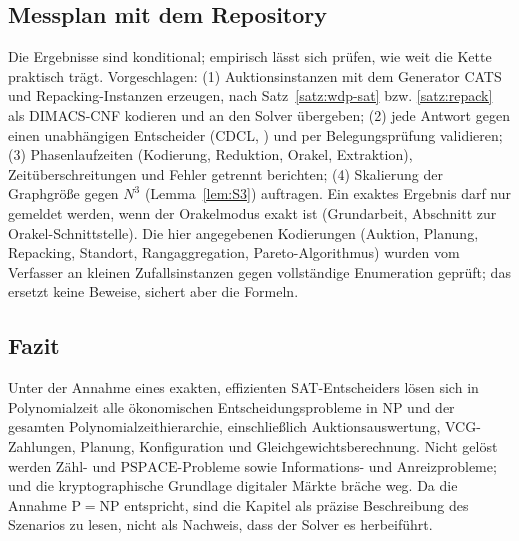 \documentclass[a4paper,12pt]{article}
\theoremstyle{definition}
\newcommand{\cP}{\ensuremath{\mathrm{P}}}
\newcommand{\cNP}{\ensuremath{\mathrm{NP}}}
\newcommand{\cPSPACE}{\ensuremath{\mathrm{PSPACE}}}
\begin{document}
\subsection{Messplan mit dem Repository}
Die Ergebnisse sind konditional; empirisch lässt sich prüfen, wie weit die Kette praktisch trägt. Vorgeschlagen: (1) Auktionsinstanzen mit dem Generator CATS \cite{leytonbrown2000} und Repacking-Instanzen erzeugen, nach Satz~\ref{satz:wdp-sat} bzw. \ref{satz:repack} als DIMACS-CNF kodieren und an den Solver übergeben; (2) jede Antwort gegen einen unabhängigen Entscheider (CDCL, \cite{minisat}) und per Belegungsprüfung validieren; (3) Phasenlaufzeiten (Kodierung, Reduktion, Orakel, Extraktion), Zeitüberschreitungen und Fehler getrennt berichten; (4) Skalierung der Graphgröße gegen \(N^3\) (Lemma~\ref{lem:S3}) auftragen. Ein exaktes Ergebnis darf nur gemeldet werden, wenn der Orakelmodus exakt ist (Grundarbeit, Abschnitt zur Orakel-Schnittstelle). Die hier angegebenen Kodierungen (Auktion, Planung, Repacking, Standort, Rangaggregation, Pareto-Algorithmus) wurden vom Verfasser an kleinen Zufallsinstanzen gegen vollständige Enumeration geprüft; das ersetzt keine Beweise, sichert aber die Formeln.

\subsection{Fazit}
Unter der Annahme eines exakten, effizienten SAT-Entscheiders lösen sich in Polynomialzeit alle ökonomischen Entscheidungsprobleme in \cNP{} und der gesamten Polynomialzeithierarchie, einschließlich Auktionsauswertung, VCG-Zahlungen, Planung, Konfiguration und Gleichgewichtsberechnung. Nicht gelöst werden Zähl- und \cPSPACE-Probleme sowie Informations- und Anreizprobleme; und die kryptographische Grundlage digitaler Märkte bräche weg. Da die Annahme \(\cP=\cNP\) entspricht, sind die Kapitel als präzise Beschreibung des Szenarios zu lesen, nicht als Nachweis, dass der Solver es herbeiführt.

\end{document}
